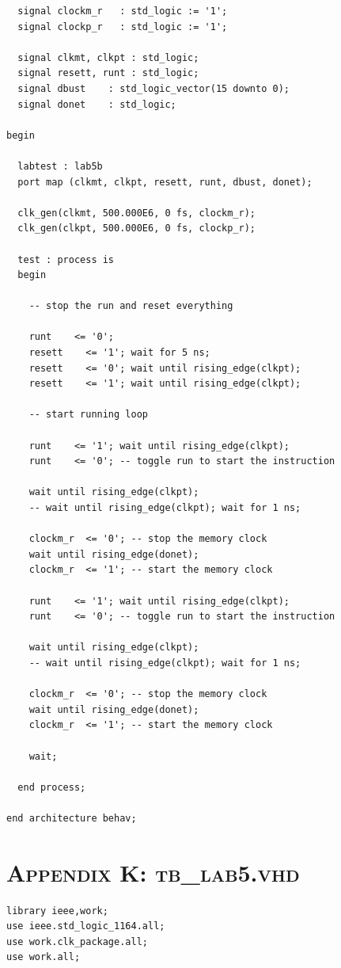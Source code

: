 \documentclass[11pt]{report}
\begin{document}
\begin{spacing}{1.5}
\begin{lstlisting}
  signal clockm_r   : std_logic := '1';
  signal clockp_r   : std_logic := '1';
  
  signal clkmt, clkpt : std_logic;
  signal resett, runt : std_logic;
  signal dbust    : std_logic_vector(15 downto 0);
  signal donet    : std_logic;

begin

  labtest : lab5b
  port map (clkmt, clkpt, resett, runt, dbust, donet);

  clk_gen(clkmt, 500.000E6, 0 fs, clockm_r);
  clk_gen(clkpt, 500.000E6, 0 fs, clockp_r);

  test : process is
  begin

    -- stop the run and reset everything

    runt    <= '0';
    resett    <= '1'; wait for 5 ns;
    resett    <= '0'; wait until rising_edge(clkpt);
    resett    <= '1'; wait until rising_edge(clkpt);

    -- start running loop

    runt    <= '1'; wait until rising_edge(clkpt);
    runt    <= '0'; -- toggle run to start the instruction

    wait until rising_edge(clkpt);
    -- wait until rising_edge(clkpt); wait for 1 ns;

    clockm_r  <= '0'; -- stop the memory clock
    wait until rising_edge(donet);
    clockm_r  <= '1'; -- start the memory clock

    runt    <= '1'; wait until rising_edge(clkpt);
    runt    <= '0'; -- toggle run to start the instruction

    wait until rising_edge(clkpt);
    -- wait until rising_edge(clkpt); wait for 1 ns;

    clockm_r  <= '0'; -- stop the memory clock
    wait until rising_edge(donet);
    clockm_r  <= '1'; -- start the memory clock

    wait;

  end process;

end architecture behav;
\end{lstlisting}

\chapter*{\scshape Appendix K: tb\_lab5.vhd}
\label{app:a}
\vspace{15px}
\begin{lstlisting}
library ieee,work;
use ieee.std_logic_1164.all;
use work.clk_package.all;
use work.all;


\end{lstlisting}
\end{spacing}
\end{document}
